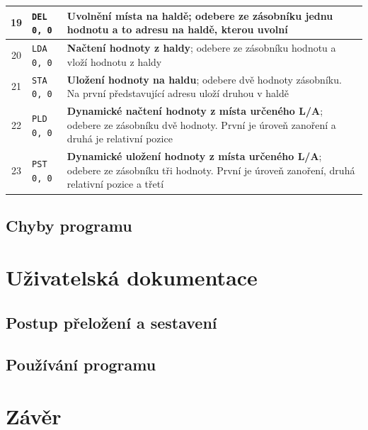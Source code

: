 \documentclass[
12pt,
a4paper,
pdftex,
czech,
titlepage
]{report}
\begin{document}
\begin{longtable}{|c|l|p{10cm}|}
\rule{0pt}{3ex} 19 & \texttt{DEL 0, 0} & \textbf{Uvolnění místa na haldě}; odebere ze zásobníku jednu hodnotu a to adresu na haldě, kterou uvolní \\ \hline
\rule{0pt}{3ex} 20 & \texttt{LDA 0, 0} & \textbf{Načtení hodnoty z haldy}; odebere ze zásobníku hodnotu a vloží hodnotu z haldy \\ \hline
\rule{0pt}{3ex} 21 & \texttt{STA 0, 0} & \textbf{Uložení hodnoty na haldu}; odebere dvě hodnoty zásobníku. Na první představující adresu uloží druhou v haldě \\ \hline
\rule{0pt}{3ex} 22 & \texttt{PLD 0, 0} & \textbf{Dynamické načtení hodnoty z místa určeného L/A}; odebere ze zásobníku dvě hodnoty. První je úroveň zanoření a druhá je relativní pozice \\ \hline
\rule{0pt}{3ex} 23 & \texttt{PST 0, 0} & \textbf{Dynamické uložení hodnoty z místa určeného L/A}; odebere ze zásobníku tři hodnoty. První je úroveň zanoření, druhá relativní pozice a třetí \\ \hline
\end{longtable}
\section{Chyby programu}

\chapter{Uživatelská dokumentace} 

\section{Postup přeložení a sestavení}

\section{Používání programu}

\chapter{Závěr}
\end{document}

